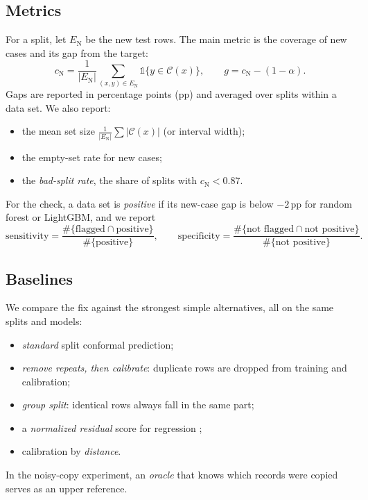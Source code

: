 \subsection{Metrics}
For a split, let $E_{\mathrm N}$ be the new test rows. The main metric is the coverage of new cases and its gap from the target:
\begin{equation}
c_{\mathrm N}=\frac{1}{|E_{\mathrm N}|}\sum_{(x,y)\in E_{\mathrm N}}\mathbb 1\{y\in\mathcal C(x)\},\qquad g=c_{\mathrm N}-(1-\alpha).\label{eq:gap}
\end{equation}
Gaps are reported in percentage points (pp) and averaged over splits within a data set. We also report:
\begin{itemize}
\item the mean set size $\frac{1}{|E_{\mathrm N}|}\sum|\mathcal C(x)|$ (or interval width);
\item the empty-set rate for new cases;
\item the \emph{bad-split rate}, the share of splits with $c_{\mathrm N}<0.87$.
\end{itemize}
For the check, a data set is \emph{positive} if its new-case gap is below $-2$\,pp for random forest or LightGBM, and we report
\begin{equation}
\text{sensitivity}=\frac{\#\{\text{flagged}\cap\text{positive}\}}{\#\{\text{positive}\}},\qquad \text{specificity}=\frac{\#\{\text{not flagged}\cap\text{not positive}\}}{\#\{\text{not positive}\}}.\label{eq:sens}
\end{equation}

\subsection{Baselines}
We compare the fix against the strongest simple alternatives, all on the same splits and models:
\begin{itemize}
\item \emph{standard} split conformal prediction;
\item \emph{remove repeats, then calibrate}: duplicate rows are dropped from training and calibration;
\item \emph{group split}: identical rows always fall in the same part;
\item a \emph{normalized residual} score for regression \citep{papadopoulos2011};
\item calibration by \emph{distance}.
\end{itemize}
In the noisy-copy experiment, an \emph{oracle} that knows which records were copied serves as an upper reference.

